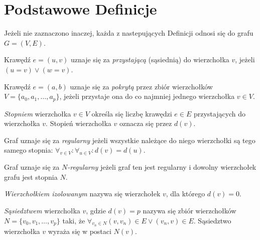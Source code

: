 \section{Podstawowe Definicje}\label{s_definitions}

Jeżeli nie zaznaczono inaczej, każda z nastepujących Definicji odnosi się do
grafu $G=(V,E)$.

\begin{definition}
  Krawędź $e=(u,v)$ uznaje się za \emph{przystającą} (sąsiednią) do wierzchołka $v$,
  jeżeli $(u=v) \lor (w=v)$.
\end{definition}

\begin{definition}
  Krawędź $e=(a,b)$ uznaje się za \emph{pokrytą} przez zbiór wierzchołków \\
  $V=\{a_0, a_1, \ldots, a_p\}$, jeżeli przystaje ona do co najmniej jednego
  wierzchołka $v \in V$.
\end{definition}

\begin{definition}
  \emph{Stopniem} wierzchołka $v \in V$ określa się 
  liczbę krawędzi $e \in E$ przystających do wierzchołka $v$.
  Stopień wierzchołka $v$ oznacza się przez $d(v)$.
\end{definition}

\begin{definition}
  Graf uznaje się za \emph{regularny} jeżeli wszystkie należące do niego wierzchołki są tego samego stopnia: $\forall_{v \in V}: \forall_{u \in V}:{d(v)=d(u)}$.
\end{definition}

\begin{definition}
  Graf uznaje się za \emph{$N$-regularny} jeżeli graf ten jest regularny i dowolny wierzchołek grafu jest stopnia $N$.
\end{definition}

\begin{definition}
  \emph{Wierzchołkiem izolowanym} nazywa się wierzchołek $v$, dla którego $d(v)=0$.
\end{definition}

\begin{definition}
  \emph{Sąsiedztwem} wierzchołka $v$, gdzie $d(v)=p$ nazywa się zbiór 
  wierzchołków $N=\{v_0, v_1, \ldots, v_p\}$ taki, że 
  $\forall_{v_n \in N}{(v,v_n) \in E \lor (v_n,v) \in E}$.
  Sąsiedztwo wierzchołka $v$ wyraża się w postaci $N(v)$.
\end{definition}

